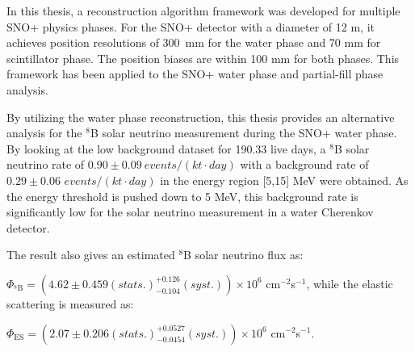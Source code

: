 In this thesis, a reconstruction algorithm framework was developed for multiple SNO+ physics phases. For the SNO+ detector with a diameter of 12 m, it achieves position resolutions of 300~mm for the water phase and 70 mm for scintillator phase. The position biases are within 100 mm for both phases. This framework has been applied to the SNO+ water phase and partial-fill phase analysis. 

By utilizing the water phase reconstruction, this thesis provides an alternative analysis for the $^8$B solar neutrino measurement during the SNO+ water phase. By looking at the low background dataset for 190.33 live days, a $^8$B solar neutrino rate of $0.90\pm0.09~events/(kt\cdot day)$ with a background rate of $0.29\pm 0.06$ $events/(kt\cdot day)$ in the energy region [5,15] MeV were obtained. As the energy threshold is pushed down to 5 MeV, this background rate is significantly low for the solar neutrino measurement in a water Cherenkov detector.

The result also gives an estimated $^8$B solar neutrino flux as: 

$\Phi_{\mathrm{^8B}}=(4.62 \pm 0.459 (stats.)^{+0.126}_{-0.104}(syst.))\times10^6$ cm$^{-2}$s$^{-1}$, 
while the elastic scattering is measured as: 

$\Phi_{\mathrm{ES}}=(2.07 \pm 0.206(stats.)^{+0.0527}_{-0.0454}(syst.))\times10^6$ cm$^{-2}$s$^{-1}$.
